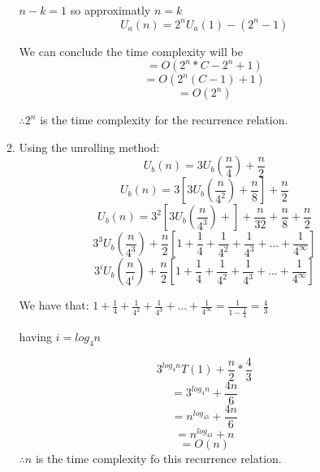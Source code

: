 \documentclass[9pt]{article}
\begin{document}
\begin{enumerate}
\begin{enumerate}
\begin{center}
  $n-k=1$ so approximatly $n=k$
  $$U_a(n) = 2^nU_a(1)-(2^n-1)$$

  We can conclude the time complexity will be 
  $$ = O(2^n*C-2^n+1)$$
  $$ = O(2^n(C-1)+1)$$
  $$ = O(2^n)$$

  $\therefore 2^n$ is the time complexity for the recurrence relation.
  \newpage
  \end{center}
  \item Using the unrolling method:
  $$U_b(n) = 3U_b\left(\frac{n}{4}\right)+\frac{n}{2}$$
  $$U_b(n) = 3\left[3U_b\left(\frac{n}{4^2}\right)+\frac{n}{8}\right]+\frac{n}{2}$$
  $$U_b(n) = 3^2\left[3U_b\left(\frac{n}{4^3}\right)+\right]+\frac{n}{32}+\frac{n}{8}+\frac{n}{2}$$
  $$3^3U_b\left(\frac{n}{4^3}\right)+\frac{n}{2}\left[1+\frac{1}{4}+\frac{1}{4^2}+\frac{1}{4^3}+...+\frac{1}{4^\infty}\right]$$
  $$3^iU_b\left(\frac{n}{4^i}\right)+\frac{n}{2}\left[1+\frac{1}{4}+\frac{1}{4^2}+\frac{1}{4^3}+...+\frac{1}{4^\infty}\right]$$
  \begin{center}
    We have that:
  $1+\frac{1}{4}+\frac{1}{4^2}+\frac{1}{4^3}+...+\frac{1}{4^\infty} = \frac{1}{1-\frac{1}{4}} = \frac{4}{3} $
  
  having $i = log_4n$
  \end{center}
  $$3^{log_4n}T(1)+\frac{n}{2}*\frac{4}{3}$$
  $$= 3^{log_4n} + \frac{4n}{6}$$
  $$= n^{log_43} + \frac{4n}{6}$$
  $$= n^{log_43} + n$$
  $$= O(n)$$
  $\therefore n$ is the time complexity fo this recurrence relation.
\end{enumerate}


\fi

\newpage



\vspace{5mm}


\end{enumerate}
\end{document}
